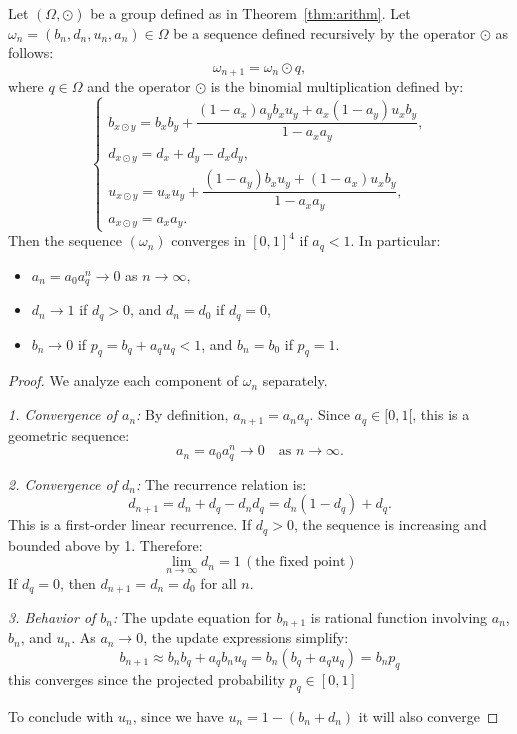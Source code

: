 \begin{theorem}\label{thm:geo}
Let $(\Omega, \odot)$ be a group defined as in Theorem~\ref{thm:arithm}.
Let $\omega_n = (b_n, d_n, u_n, a_n) \in \Omega$ be a sequence defined recursively by the operator $\odot$ as follows:
\[
\omega_{n+1} = \omega_n \odot q,
\]
where \(q\in \Omega\) and the operator $\odot$ is the binomial multiplication defined by:
\[
\begin{cases}
b_{x \odot y} = b_x b_y + \dfrac{(1 - a_x) a_y b_x u_y + a_x (1 - a_y) u_x b_y}{1 - a_x a_y}, \\
d_{x \odot y} = d_x + d_y - d_x d_y, \\
u_{x \odot y} = u_x u_y + \dfrac{(1 - a_y) b_x u_y + (1 - a_x) u_x b_y}{1 - a_x a_y}, \\
a_{x \odot y} = a_x a_y.
\end{cases}
\]
Then the sequence $(\omega_n)$ converges in $[0,1]^4$ if $a_q < 1$. In particular:
\begin{itemize}
    \item $a_n = a_0 a_q^n \to 0$ as $n \to \infty$,
    \item $d_n \to 1$ if $d_q > 0$, and $d_n = d_0$ if $d_q = 0$,
    \item $b_n \to 0 $ if $p_q = b_q + a_q u_q < 1$, and $b_n = b_0 $ if $p_q = 1$.
\end{itemize}
\end{theorem}

\begin{proof}
We analyze each component of $\omega_n$ separately.

\emph{1. Convergence of $a_n$:}  
By definition, $a_{n+1} = a_n a_q$. Since $a_q \in [0,1[$, this is a geometric sequence:
\[
a_n = a_0 a_q^n \to 0 \quad \text{as } n \to \infty.
\]

\emph{2. Convergence of $d_n$:}  
The recurrence relation is:
\[
d_{n+1} = d_n + d_q - d_n d_q = d_n (1 - d_q) + d_q.
\]
This is a first-order linear recurrence. If $d_q > 0$, the sequence is increasing and bounded above by 1. Therefore:
\[
\lim_{n \to \infty} d_n = 1\, (\text{the fixed point})
\]
If $d_q = 0$, then $d_{n+1} = d_n = d_0$ for all $n$.

\emph{3. Behavior of $b_n$:}  
The update equation for $b_{n+1}$ is rational function involving $a_n$, $b_n$, and $u_n$. As $a_n \to 0$, the update expressions simplify:
\[
b_{n+1} \approx b_n b_q + a_q b_n u_q = b_n (b_q + a_q u_q ) = b_n p_q
\]
this converges since the projected probability \(p_q \in [0,1] \)
 
To conclude with \(u_n\), since we have \(u_n = 1 - (b_n + d_n)\) it will also converge

\end{proof}

